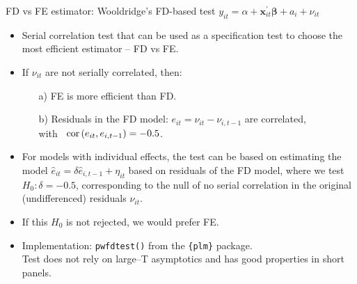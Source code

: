\documentclass[usenames,dvipsnames]{beamer}
\begin{document}
\begin{frame}{FD vs FE estimator: Wooldridge's FD-based test}
\small
$y_{it} = \alpha + \bm{x}^{\prime}_{it} \bm{\beta} + a_i + \nu_{it}$\\ \medskip
\begin{itemize}
    \item Serial correlation test that can be used as a specification test to choose the most efficient estimator -- FD vs FE.
    \item If $\nu_{it}$ are not serially correlated, then: 
    \begin{itemize}
          \item[a)] FE is more efficient than FD.
          \item[b)] Residuals in the FD model: $e_{it} = \nu_{it}-\nu_{i,t-1}$ are correlated, \\with~ $\textnormal{cor}\left(e_{it},e_{i,t-1}\right)=-0.5$.
        \end{itemize}
        \item For models with individual effects, the test can be based on estimating the model $\hat{e}_{it}=\delta \hat{e}_{i,t-1}+\eta_{it}$ based on residuals of the FD model, where we test $H_0: \delta=-0.5$, corresponding to the null of no serial correlation in the original (undifferenced) residuals $\nu_{it}$. 
        \medskip
        \item If this $H_0$ is not rejected, we would prefer FE.
        \medskip
        \item Implementation: \texttt{pwfdtest()} from the \texttt{\{plm\}} package. \\ \smallskip  Test does not rely on large–T asymptotics and has good properties in short panels.
\end{itemize}
\end{frame}
\end{document}
